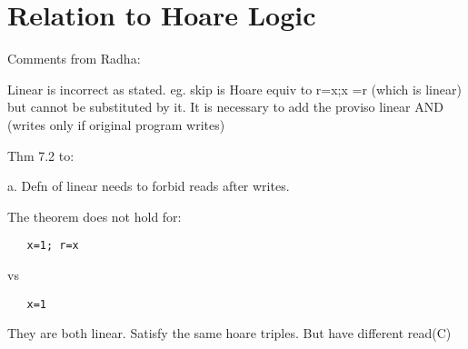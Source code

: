 


\section{Relation to Hoare Logic}

Comments from Radha:

Linear is incorrect as stated. eg. skip is Hoare equiv to r=x;x =r (which is
linear) but cannot be substituted by it.  It is necessary to add the proviso
linear AND (writes only if original program writes)

Thm 7.2 to:

    
a. Defn of linear needs to forbid reads after writes. 

The theorem does not hold for:
\begin{verbatim}
   x=1; r=x
\end{verbatim}
vs
\begin{verbatim}
   x=1
\end{verbatim}
They are both linear. Satisfy the same hoare triples.  But have different
read(C)




